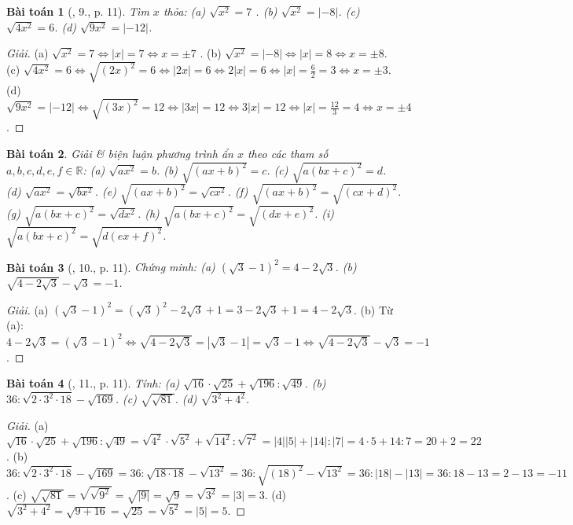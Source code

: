 \documentclass{article}
\newtheorem{baitoan}{Bài toán}
\begin{document}
\begin{baitoan}[\cite{SGK_Toan_9_tap_1}, 9., p. 11]
	Tìm $x$ thỏa: (a) $\sqrt{x^2} = 7$ . (b) $\sqrt{x^2} = |-8|$. (c) $\sqrt{4x^2} = 6$. (d) $\sqrt{9x^2} = |-12|$.
\end{baitoan}

\begin{proof}[Giải]
	(a) $\sqrt{x^2} = 7\Leftrightarrow|x| = 7\Leftrightarrow x = \pm7$ . (b) $\sqrt{x^2} = |-8|\Leftrightarrow|x| = 8\Leftrightarrow x = \pm8$. (c) $\sqrt{4x^2} = 6\Leftrightarrow\sqrt{(2x)^2} = 6\Leftrightarrow|2x| = 6\Leftrightarrow2|x| = 6\Leftrightarrow|x| = \frac{6}{2} = 3\Leftrightarrow x = \pm3$. (d) $\sqrt{9x^2} = |-12|\Leftrightarrow\sqrt{(3x)^2} = 12\Leftrightarrow|3x| = 12\Leftrightarrow3|x| = 12\Leftrightarrow|x| = \frac{12}{3} = 4\Leftrightarrow x = \pm4$.
\end{proof}

\begin{baitoan}
	Giải \& biện luận phương trình ẩn $x$ theo các tham số $a,b,c,d,e,f\in\mathbb{R}$: (a) $\sqrt{ax^2} = b$. (b) $\sqrt{(ax + b)^2} = c$. (c) $\sqrt{a(bx + c)^2} = d$. (d) $\sqrt{ax^2} = \sqrt{bx^2}$. (e) $\sqrt{(ax + b)^2} = \sqrt{cx^2}$. (f) $\sqrt{(ax + b)^2} = \sqrt{(cx + d)^2}$. (g) $\sqrt{a(bx + c)^2} = \sqrt{dx^2}$. (h) $\sqrt{a(bx + c)^2} = \sqrt{(dx + e)^2}$. (i) $\sqrt{a(bx + c)^2} = \sqrt{d(ex + f)^2}$.
\end{baitoan}

\begin{baitoan}[\cite{SGK_Toan_9_tap_1}, 10., p. 11]
	Chứng minh: (a) $(\sqrt{3} - 1)^2 = 4 - 2\sqrt{3}$. (b) $\sqrt{4 - 2\sqrt{3}} - \sqrt{3} = -1$.
\end{baitoan}

\begin{proof}[Giải]
	(a) $(\sqrt{3} - 1)^2 = (\sqrt{3})^2 - 2\sqrt{3} + 1 = 3 - 2\sqrt{3} + 1 = 4 - 2\sqrt{3}$. (b) Từ (a): $4 - 2\sqrt{3} = (\sqrt{3} - 1)^2\Leftrightarrow\sqrt{4 - 2\sqrt{3}} = |\sqrt{3} - 1| = \sqrt{3} - 1\Leftrightarrow\sqrt{4 - 2\sqrt{3}} - \sqrt{3} = -1$.
\end{proof}

\begin{baitoan}[\cite{SGK_Toan_9_tap_1}, 11., p. 11]
	Tính: (a) $\sqrt{16}\cdot\sqrt{25} + \sqrt{196}:\sqrt{49}$. (b) $36:\sqrt{2\cdot3^2\cdot18} - \sqrt{169}$. (c)  $\sqrt{\sqrt{81}}$. (d) $\sqrt{3^2 + 4^2}$.
\end{baitoan}

\begin{proof}[Giải]
	(a) $\sqrt{16}\cdot\sqrt{25} + \sqrt{196}:\sqrt{49} = \sqrt{4^2}\cdot\sqrt{5^2} + \sqrt{14^2}:\sqrt{7^2} = |4||5| + |14|:|7| = 4\cdot5 + 14:7 = 20 + 2 = 22$. (b) $36:\sqrt{2\cdot3^2\cdot18} - \sqrt{169} = 36:\sqrt{18\cdot18} - \sqrt{13^2} = 36:\sqrt{(18)^2} - \sqrt{13^2} = 36:|18| - |13| = 36:18 - 13 = 2 - 13 = -11$. (c) $\sqrt{\sqrt{81}} = \sqrt{\sqrt{9^2}} = \sqrt{|9|} = \sqrt{9} = \sqrt{3^2} = |3| = 3$. (d) $\sqrt{3^2 + 4^2} = \sqrt{9 + 16} = \sqrt{25} = \sqrt{5^2} = |5| = 5$.
\end{proof}
\end{document}
